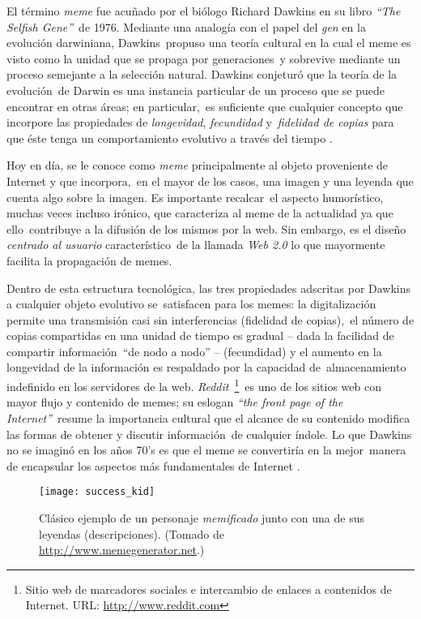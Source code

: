 \noindent
El término \emph{meme} fue acuñado por el biólogo Richard Dawkins en su libro \emph{``The Selfish Gene''}\
de 1976. Mediante una analogía con el papel del \emph{gen} en la evolución darwiniana, Dawkins\
propuso una teoría cultural en la cual el meme es visto como la unidad que se propaga por generaciones\
y sobrevive mediante un proceso semejante a la selección natural. Dawkins conjeturó que la teoría de la evolución\
de Darwin es una instancia particular de un proceso que se puede encontrar en otras áreas; en particular,\
es suficiente que cualquier concepto que incorpore las propiedades de \emph{longevidad}, \emph{fecundidad} y\
\emph{fidelidad de copias} para que éste tenga un comportamiento evolutivo a través del tiempo \cite{distin2005}.\par
Hoy en día, se le conoce como \emph{meme} principalmente al objeto proveniente de Internet y que incorpora,\
en el mayor de los casos, una imagen y una leyenda que cuenta algo sobre la imagen. Es importante recalcar\
el aspecto humorístico, muchas veces incluso irónico, que caracteriza al meme de la actualidad ya que ello\
contribuye a la difusión de los mismos por la web. Sin embargo, es el diseño \emph{centrado al usuario} característico\
de la llamada \emph{Web 2.0} lo que mayormente facilita la propagación de memes.\par
Dentro de esta estructura tecnológica, las tres propiedades adscritas por Dawkins a cualquier objeto evolutivo se\
satisfacen para los memes: la digitalización permite una transmisión casi sin interferencias (fidelidad de copias),\
el número de copias compartidas en una unidad de tiempo es gradual -- dada la facilidad de compartir información\
``de nodo a nodo'' -- (fecundidad) y el aumento en la longevidad de la información es respaldado por la capacidad de\
almacenamiento indefinido en los servidores de la web. \emph{Reddit}\
\footnote{Sitio web de marcadores sociales e intercambio de enlaces a contenidos de Internet. URL: \url{http://www.reddit.com}}\
es uno de los sitios web con mayor flujo y contenido de memes; su eslogan \emph{``the front page of the Internet''}\
resume la importancia cultural que el alcance de su contenido modifica las formas de obtener y discutir información\
de cualquier índole. Lo que Dawkins no se imaginó en los años 70's es que el meme se convertiría en la mejor\
manera de encapsular los aspectos más fundamentales de Internet \cite{shifman2014}.

\begin{figure}
  \centering
  \texttt{[image: success\_kid]}
  \caption{Clásico ejemplo de un personaje \emph{memificado} junto con una de sus
    leyendas (descripciones). (Tomado de \url{http://www.memegenerator.net}.)}
\end{figure}

